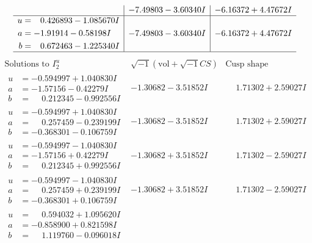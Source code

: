 \documentclass[1p]{elsarticle_modified}
\theoremstyle{definition}
\newcommand{\I}{\sqrt{-1}}
\begin{document}
$$\begin{array}{c|c|c}
 & -7.49803 - 3.60340 I & -6.16372 + 4.47672 I \\ \hline\begin{aligned}
u &= \phantom{-}0.426893 - 1.085670 I \\
a &= -1.91914 - 0.58198 I \\
b &= \phantom{-}0.672463 - 1.225340 I\end{aligned}
 & -7.49803 - 3.60340 I & -6.16372 + 4.47672 I\\
 \hline 
 \end{array}$$\newpage$$\begin{array}{c|c|c}  
\text{Solutions to }I^u_{2}& \I (\text{vol} + \sqrt{-1}CS) & \text{Cusp shape}\\
 \hline 
\begin{aligned}
u &= -0.594997 + 1.040830 I \\
a &= -1.57156 - 0.42279 I \\
b &= \phantom{-}0.212345 - 0.992556 I\end{aligned}
 & -1.30682 - 3.51852 I & \phantom{-}1.71302 + 2.59027 I \\ \hline\begin{aligned}
u &= -0.594997 + 1.040830 I \\
a &= \phantom{-}0.257459 - 0.239199 I \\
b &= -0.368301 - 0.106759 I\end{aligned}
 & -1.30682 - 3.51852 I & \phantom{-}1.71302 + 2.59027 I \\ \hline\begin{aligned}
u &= -0.594997 - 1.040830 I \\
a &= -1.57156 + 0.42279 I \\
b &= \phantom{-}0.212345 + 0.992556 I\end{aligned}
 & -1.30682 + 3.51852 I & \phantom{-}1.71302 - 2.59027 I \\ \hline\begin{aligned}
u &= -0.594997 - 1.040830 I \\
a &= \phantom{-}0.257459 + 0.239199 I \\
b &= -0.368301 + 0.106759 I\end{aligned}
 & -1.30682 + 3.51852 I & \phantom{-}1.71302 - 2.59027 I \\ \hline\begin{aligned}
u &= \phantom{-}0.594032 + 1.095620 I \\
a &= -0.858900 + 0.821598 I \\
b &= \phantom{-}1.119760 - 0.096018 I\end{aligned}

\end{array}$$
\end{document}

